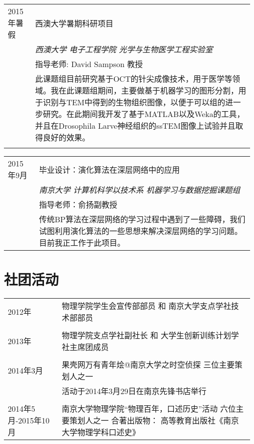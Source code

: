 \documentclass[CHN]{Sketch}
\begin{document}
\begin{tabular}{p{2cm}|p{12cm}}

\textsc{2015年暑假} & 西澳大学暑期科研项目 \\
&\emph{西澳大学 电子工程学院 光学与生物医学工程实验室}\\
& 指导老师: David Sampson 教授 \\
&\footnotesize{此课题组目前研究基于OCT的针尖成像技术，用于医学等领域。我在此课题组期间，主要做基于机器学习的图形分割，用于识别与TEM中得到的生物组织图像，以便于可以组的进一步研究。在此期间我开发了基于MATLAB以及Weka的工具，并且在Drosophila Larve神经组织的ssTEM图像上试验并且取得良好的效果。}\\

\multicolumn{2}{c}{} \\
\end{tabular}

\begin{tabular}{p{2cm}|p{12cm}}

\textsc{2015年9月} & 毕业设计：演化算法在深层网络中的应用\\
&\emph{南京大学 计算机科学以技术系 机器学习与数据挖掘课题组}\\
& 指导老师：俞扬副教授 \\
&\footnotesize{传统BP算法在深层网络的学习过程中遇到了一些障碍，我们试图利用演化算法的一些思想来解决深层网络的学习问题。目前我正工作于此项目。}\\

\end{tabular}

\section{社团活动}
\begin{tabular}{p{2cm}|p{12cm}}

\textsc{2012年} & 物理学院学生会宣传部部员 和 南京大学支点学社技术部部员 \\
 
 \multicolumn{2}{c}{} \\
 
\textsc{2013年} &  物理学院支点学社副社长 和 大学生创新训练计划学社主席团成员 \\

 \multicolumn{2}{c}{} \\
 
\textsc{2014年3月} &  果壳网万有青年烩@南京大学之时空侦探 三位主要策划人之一   \\ &活动于2014年3月29日在南京先锋书店举行\\

 \multicolumn{2}{c}{} \\
 
\textsc{2014年5月-2015年10月} &  南京大学物理学院“物理百年，口述历史”活动 六位主要策划人之一 
合著出版物： 高等教育出版社《南京大学物理学科口述史》 \\

\end{tabular}
\end{document}
